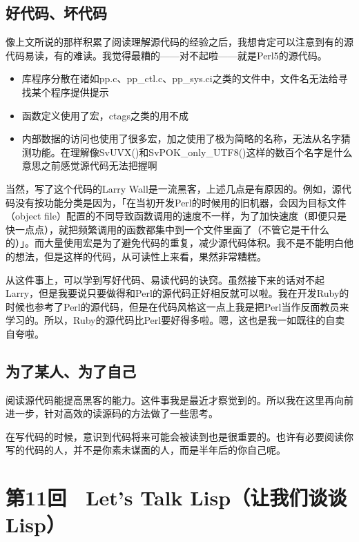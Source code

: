 \documentclass[a4paper,12pt]{article}
\begin{document}
\subsection{好代码、坏代码}

像上文所说的那样积累了阅读理解源代码的经验之后，我想肯定可以注意到有的源代码易读，有的难读。我觉得最糟的——对不起啦——就是Perl5的源代码。
\begin{itemize}
\item 库程序分散在诸如pp.c、pp\_ctl.c、pp\_sys.ci之类的文件中，文件名无法给寻找某个程序提供提示
\item 函数定义使用了宏，ctags之类的用不成
\item 内部数据的访问也使用了很多宏，加之使用了极为简略的名称，无法从名字猜测功能。在理解像SvUVX()和SvPOK\_only\_UTF8()这样的数百个名字是什么意思之前感觉源代码无法把握啊
\end{itemize}
当然，写了这个代码的Larry Wall是一流黑客，上述几点是有原因的。例如，源代码没有按功能分类是因为，「在当初开发Perl的时候用的旧机器，会因为目标文件（object file）配置的不同导致函数调用的速度不一样，为了加快速度（即便只是快一点点），就把频繁调用的函数都集中到一个文件里面了（不管它是干什么的）」。而大量使用宏是为了避免代码的重复，减少源代码体积。我不是不能明白他的想法，但是这样的代码，从可读性上来看，果然非常糟糕。

从这件事上，可以学到写好代码、易读代码的诀窍。虽然接下来的话对不起Larry，但是我要说只要做得和Perl的源代码正好相反就可以啦。我在开发Ruby的时候也参考了Perl的源代码，但是在代码风格这一点上我是把Perl当作反面教员来学习的。所以，Ruby的源代码比Perl要好得多啦。嗯，这也是我一如既往的自卖自夸啦。

\subsection{为了某人、为了自己}

阅读源代码能提高黑客的能力。这件事我是最近才察觉到的。所以我在这里再向前进一步，针对高效的读源码的方法做了一些思考。

在写代码的时候，意识到代码将来可能会被读到也是很重要的。也许有必要阅读你写的代码的人，并不是你素未谋面的人，而是半年后的你自己呢。


\section{第11回　Let's Talk Lisp（让我们谈谈Lisp）}
\end{document}
